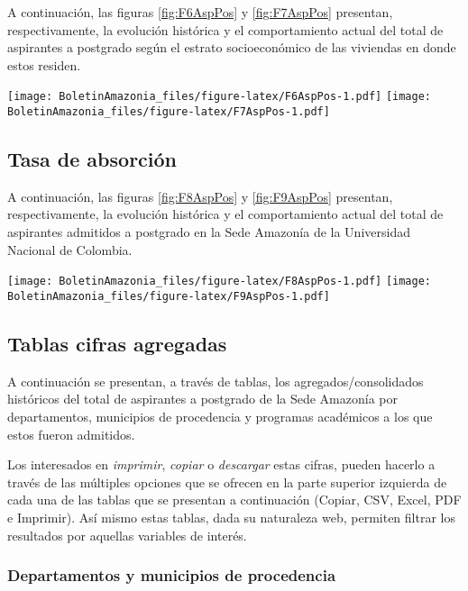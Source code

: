 \documentclass[
]{book}
\begin{document}
A continuación, las figuras \ref{fig:F6AspPos} y \ref{fig:F7AspPos} presentan, respectivamente, la evolución histórica y el comportamiento actual del total de aspirantes a postgrado según el estrato socioeconómico de las viviendas en donde estos residen.

\texttt{[image: BoletinAmazonia\_files/figure-latex/F6AspPos-1.pdf]}
\texttt{[image: BoletinAmazonia\_files/figure-latex/F7AspPos-1.pdf]}

\hypertarget{tasa-de-absorciuxf3n-1}{%
\subsection{Tasa de absorción}\label{tasa-de-absorciuxf3n-1}}

A continuación, las figuras \ref{fig:F8AspPos} y \ref{fig:F9AspPos} presentan, respectivamente, la evolución histórica y el comportamiento actual del total de aspirantes admitidos a postgrado en la Sede Amazonía de la Universidad Nacional de Colombia.

\texttt{[image: BoletinAmazonia\_files/figure-latex/F8AspPos-1.pdf]}
\texttt{[image: BoletinAmazonia\_files/figure-latex/F9AspPos-1.pdf]}

\hypertarget{tablas-cifras-agregadas-2}{%
\subsection{Tablas cifras agregadas}\label{tablas-cifras-agregadas-2}}

A continuación se presentan, a través de tablas, los agregados/consolidados históricos del total de aspirantes a postgrado de la Sede Amazonía por departamentos, municipios de procedencia y programas académicos a los que estos fueron admitidos.

Los interesados en \emph{imprimir}, \emph{copiar} o \emph{descargar} estas cifras, pueden hacerlo a través de las múltiples opciones que se ofrecen en la parte superior izquierda de cada una de las tablas que se presentan a continuación (Copiar, CSV, Excel, PDF e Imprimir). Así mismo estas tablas, dada su naturaleza web, permiten filtrar los resultados por aquellas variables de interés.

\hypertarget{departamentos-y-municipios-de-procedencia-1}{%
\subsubsection{Departamentos y municipios de procedencia}\label{departamentos-y-municipios-de-procedencia-1}}
\end{document}
